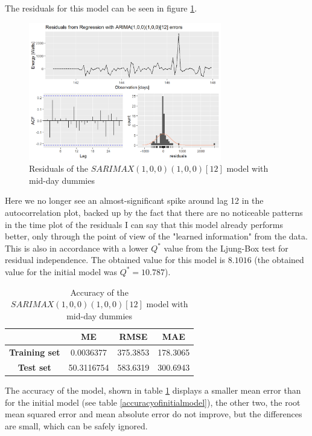 \documentclass[12pt,a4paper,titlepage]{report}
\begin{document}
The residuals for this model can be seen in figure \ref{dlastweek2hrsph3residualsDummies}.

\begin{figure}[h]
    \centering
    \includegraphics[width=0.75\textwidth]{dlastweek2hrsph3residualsDummies}
    \caption{Residuals of the $ SARIMAX(1, 0, 0)(1, 0, 0)[12] $ model with mid-day dummies}
    \label{dlastweek2hrsph3residualsDummies}
\end{figure}

Here we no longer see an almost-significant spike around lag 12 in the autocorrelation plot, backed up by the fact that there are no noticeable patterns in the time plot of the residuals I can say that this model already performs better, only through the point of view of the "learned information" from the data. This is also in accordance with a lower $ Q^* $ value from the Ljung-Box test for residual independence. The obtained value for this model is $8.1016 $ (the obtained value for the initial model was $ Q^* = 10.787 $).

\begin{table}[h]
    \begin{tabular}{|c|c|c|c|}
        \hline
        & \textbf{ME} & \textbf{RMSE} & \textbf{MAE}\\
        \hline
        \textbf{Training set} & 0.0036377 &	375.3853 &	178.3065 \\
        \hline
        \textbf{Test set} & 50.3116754 &	583.6319 &	300.6943 \\
        \hline
    \end{tabular}
    \centering
    \caption{Accuracy of the $ SARIMAX(1, 0, 0)(1, 0, 0)[12] $ model with mid-day dummies}
    \label{accuracyofDummiesmodel}
\end{table}

The accuracy of the model, shown in table \ref{accuracyofDummiesmodel} displays a smaller mean error than for the initial model (see table \ref{accuracyofinitialmodel}), the other two, the root mean squared error and mean absolute error do not improve, but the differences are small, which can be safely ignored.
\end{document}

